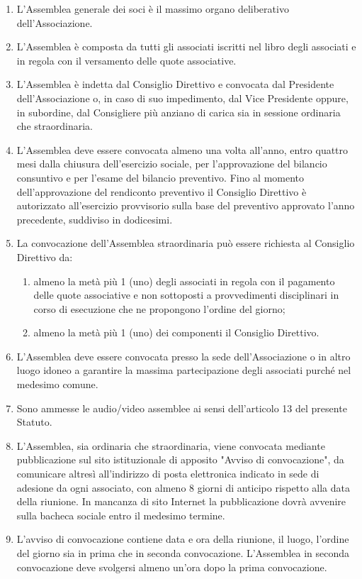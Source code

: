 \documentclass{djtsasddoc}
\begin{document}
	\begin{enumerate}
		\item L'Assemblea generale dei soci è il massimo organo deliberativo dell'Associazione.
		\item L'Assemblea è composta da tutti gli associati iscritti nel libro degli associati e in regola con il versamento delle quote associative.
		\item L'Assemblea è indetta dal Consiglio Direttivo e convocata dal Presidente dell'Associazione o, in caso di suo impedimento, dal Vice  Presidente oppure, in subordine, dal Consigliere più anziano di carica sia in sessione ordinaria che straordinaria.
		\item L'Assemblea deve essere convocata almeno una volta all'anno, entro quattro mesi dalla chiusura dell'esercizio sociale, per l'approvazione del bilancio consuntivo e per l'esame del bilancio preventivo. Fino al momento dell'approvazione del rendiconto preventivo il Consiglio Direttivo è autorizzato all'esercizio provvisorio sulla base del preventivo approvato l'anno precedente, suddiviso in dodicesimi.
		\item La convocazione dell'Assemblea straordinaria può essere richiesta al Consiglio Direttivo da:
		\begin{enumerate}
			\item almeno la metà più 1 (uno)  degli associati in regola con il pagamento delle quote associative e non sottoposti a provvedimenti disciplinari in corso di esecuzione che ne propongono l'ordine del giorno;
			\item almeno la metà più 1 (uno) dei componenti il Consiglio Direttivo.
		\end{enumerate}
		\item L'Assemblea deve essere convocata presso la sede dell'Associazione o in altro luogo idoneo a garantire la massima partecipazione degli associati  purché nel  medesimo comune.
		\item Sono ammesse le audio/video assemblee ai sensi dell'articolo 13 del presente Statuto.
		\item L'Assemblea, sia ordinaria che straordinaria, viene convocata mediante pubblicazione sul sito istituzionale di apposito "Avviso di convocazione", da comunicare altresì all'indirizzo di posta elettronica indicato in sede di adesione da ogni associato, con almeno 8 giorni di anticipo rispetto alla data della riunione. In mancanza di sito Internet la pubblicazione dovrà avvenire sulla bacheca sociale entro il medesimo termine.
		\item L'avviso di convocazione contiene data e ora della riunione, il luogo, l'ordine del giorno sia in prima che in seconda convocazione. L'Assemblea in seconda convocazione deve svolgersi almeno un'ora dopo la prima convocazione.

\end{enumerate}
\end{document}
